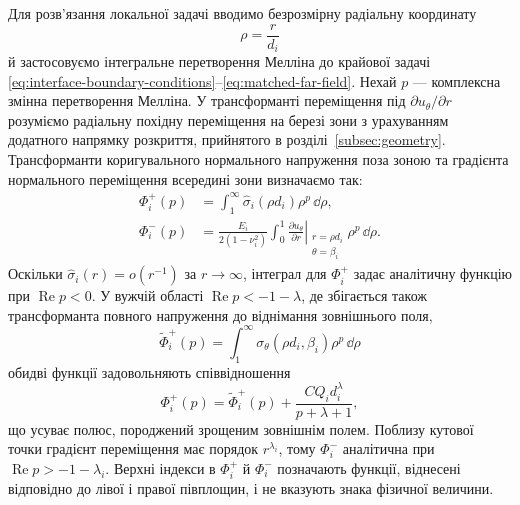 Для розв’язання локальної задачі вводимо безрозмірну радіальну координату
\begin{equation*}
  \rho=\frac{r}{d_i}
\end{equation*}
й застосовуємо інтегральне перетворення Мелліна до крайової задачі \eqref{eq:interface-boundary-conditions}--\eqref{eq:matched-far-field}. Нехай $p$ — комплексна змінна перетворення Мелліна. У трансформанті переміщення під $\partial u_\theta/\partial r$ розуміємо радіальну похідну переміщення на березі зони з урахуванням додатного напрямку розкриття, прийнятого в розділі~\ref{subsec:geometry}. Трансформанти коригувального нормального напруження поза зоною та градієнта нормального переміщення всередині зони визначаємо так:
\begin{equation*}
\begin{aligned}
  \Phi_i^+(p)
    &=\int_1^\infty
      \widehat{\sigma}_i(\rho d_i)\rho^p\,\dd\rho,\\
  \Phi_i^-(p)
    &=\frac{E_i}{2(1-\nu_i^2)}
      \int_0^1
      \left.
      \frac{\partial u_\theta}{\partial r}
      \right|_{\substack{r=\rho d_i\\\theta=\beta_i}}
      \rho^p\,\dd\rho.
\end{aligned}
\end{equation*}
Оскільки $\widehat{\sigma}_i(r)=o(r^{-1})$ за $r\to\infty$, інтеграл для $\Phi_i^+$ задає аналітичну функцію при $\operatorname{Re}p<0$. У вужчій області $\operatorname{Re}p<-1-\lambda$, де збігається також трансформанта повного напруження до віднімання зовнішнього поля,
\begin{equation*}
  \widetilde{\Phi}_i^+(p)
  =\int_1^\infty
    \sigma_\theta(\rho d_i,\beta_i)\rho^p\,\dd\rho
\end{equation*}
обидві функції задовольняють співвідношення
\begin{equation*}
  \Phi_i^+(p)
  =\widetilde{\Phi}_i^+(p)
   +\frac{CQ_i d_i^\lambda}{p+\lambda+1},
\end{equation*}
що усуває полюс, породжений зрощеним зовнішнім полем. Поблизу кутової точки градієнт переміщення має порядок $r^{\lambda_i}$, тому $\Phi_i^-$ аналітична при $\operatorname{Re}p>-1-\lambda_i$. Верхні індекси в $\Phi_i^+$ й $\Phi_i^-$ позначають функції, віднесені відповідно до лівої і правої півплощин, і не вказують знака фізичної величини.

